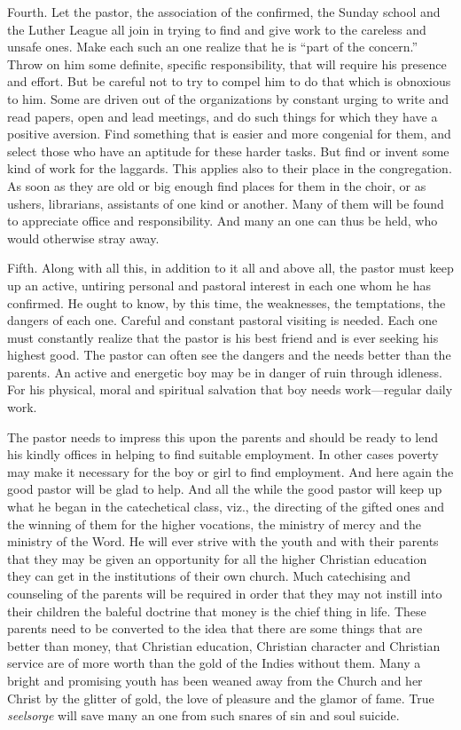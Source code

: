  Fourth. Let the pastor, the association of the confirmed, the Sunday school and the Luther League all join in trying to find and give work to the careless and unsafe ones. Make each such an one realize that he is “part of the concern.” Throw on him some definite, specific responsibility, that will require his presence and effort. But be careful not
to try to compel him to do that which is obnoxious to him. Some are driven out of the organizations by constant urging to write and read papers, open and lead meetings, and do such things for which they have a positive aversion. Find something that is easier and more congenial for them, and select those who have an aptitude for these harder tasks. But find or invent some kind of work for the laggards. This applies also to their place in the congregation. As soon as they are old or big enough find places for them in the choir, or as ushers, librarians, assistants of one kind or another. Many of them will be found to appreciate office and responsibility. And many an one can thus be held, who would otherwise stray away. 

Fifth. Along with all this, in addition to it all and above all, the pastor must keep up an active, untiring personal and pastoral interest in each one whom he has confirmed.  He ought to know, by this time, the weaknesses, the temptations, the dangers of each one. Careful and constant pastoral visiting is needed. Each one must constantly realize that the pastor is his best friend and is ever seeking his highest good. The pastor can often see the dangers and the needs better than the parents. An active and energetic boy may be in danger of ruin through idleness. For his physical, moral and spiritual salvation that boy needs work—regular daily work.

The pastor needs to impress this upon the parents and should be ready to lend his kindly offices in helping to find suitable employment. In other cases poverty may make it necessary for the boy or girl to find employment. And here again the good pastor will be glad to help. And all the while the good pastor will keep up what he began in the catechetical class, viz., the directing of the gifted ones and the winning of them for the higher vocations, the ministry of mercy and the ministry of the Word. He will ever strive with the youth and with their parents that they may be given an opportunity for all the higher Christian education they can get in the institutions of their own church. Much catechising and counseling of the parents will be required in order that they may not instill into their children the baleful doctrine that money is the chief thing in life. These parents need to be converted to the idea that there are some things that are better than money, that Christian education, Christian character and Christian service are of more worth than the gold of the Indies without them. Many a bright and promising youth has been weaned away from the Church and her Christ by the glitter of gold, the love of pleasure and the glamor of fame. True \emph{seelsorge} will save many an one from such snares of sin and soul suicide.

